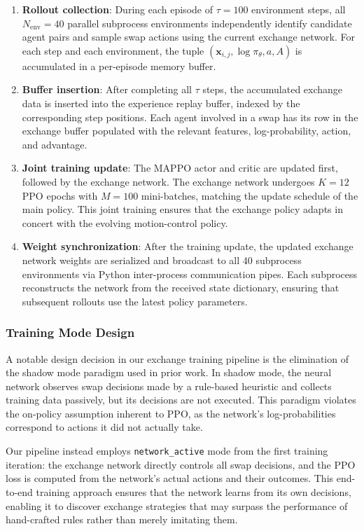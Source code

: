 \begin{enumerate}
    \item \textbf{Rollout collection}: During each episode of $\tau = 100$ environment steps, all $N_{\text{env}} = 40$ parallel subprocess environments independently identify candidate agent pairs and sample swap actions using the current exchange network. For each step and each environment, the tuple $(\mathbf{x}_{i,j}, \log \pi_\theta, a, A)$ is accumulated in a per-episode memory buffer.
    \item \textbf{Buffer insertion}: After completing all $\tau$ steps, the accumulated exchange data is inserted into the experience replay buffer, indexed by the corresponding step positions. Each agent involved in a swap has its row in the exchange buffer populated with the relevant features, log-probability, action, and advantage.
    \item \textbf{Joint training update}: The MAPPO actor and critic are updated first, followed by the exchange network. The exchange network undergoes $K = 12$ PPO epochs with $M = 100$ mini-batches, matching the update schedule of the main policy. This joint training ensures that the exchange policy adapts in concert with the evolving motion-control policy.
    \item \textbf{Weight synchronization}: After the training update, the updated exchange network weights are serialized and broadcast to all 40 subprocess environments via Python inter-process communication pipes. Each subprocess reconstructs the network from the received state dictionary, ensuring that subsequent rollouts use the latest policy parameters.
\end{enumerate}

\subsubsection{Training Mode Design}

A notable design decision in our exchange training pipeline is the elimination of the shadow mode paradigm used in prior work. In shadow mode, the neural network observes swap decisions made by a rule-based heuristic and collects training data passively, but its decisions are not executed. This paradigm violates the on-policy assumption inherent to PPO, as the network's log-probabilities correspond to actions it did not actually take.

Our pipeline instead employs \texttt{network\_active} mode from the first training iteration: the exchange network directly controls all swap decisions, and the PPO loss is computed from the network's actual actions and their outcomes. This end-to-end training approach ensures that the network learns from its own decisions, enabling it to discover exchange strategies that may surpass the performance of hand-crafted rules rather than merely imitating them.

